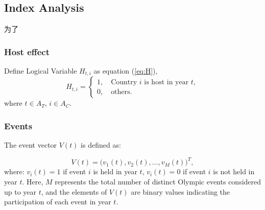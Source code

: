 \documentclass{mcmthesis}
\begin{document}












\subsection{Index Analysis}
为了
\subsubsection{Host effect}

Define Logical Variable $H_{t,i}$ as equation (\ref{eq:H}),
\begin{equation}
	H_{t,i}=
	\begin{cases}
		1, \quad \text{Country } i \text{ is host in year } t, \\
		0, \quad \text{others}.
	\end{cases}
	\label{eq:H}
\end{equation}
where $t\in A_{T}$, $i\in A_{C}$.



\subsubsection{Events}
The event vector \( V(t) \) is defined as:

\[
V(t) = \big( v_1(t), v_2(t), \dots, v_M(t) \big)^T,
\]
where: \( v_i(t) = 1 \) if event \( i \) is held in year \( t \),
\( v_i(t) = 0 \) if event \( i \) is not held in year \( t \). Here, \( M \) represents the total number of distinct Olympic events considered up to year \( t \), and the elements of \( V(t) \) are binary values indicating the participation of each event in year \( t \).
\end{document}
